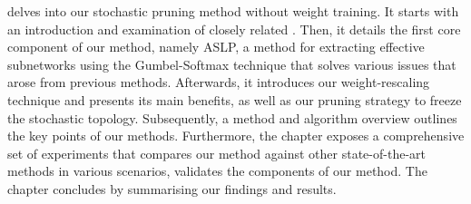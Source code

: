  delves into our stochastic pruning method without weight
training. It starts with an introduction and examination of closely related
\DIFdelbegin {}\DIFdelend \DIFaddbegin {}\DIFaddend . Then, it details the first core component of our method, namely
\acl{ASLP}, a method for extracting effective subnetworks using the
Gumbel-Softmax technique that solves various issues that arose from previous
methods. Afterwards, it introduces our weight-rescaling technique and presents
its main benefits, as well as our pruning strategy to freeze the stochastic
topology. Subsequently, a method and algorithm overview outlines the key points
of our methods. Furthermore, the chapter exposes a comprehensive set of
experiments that compares our method against other state-of-the-art methods in
various scenarios, validates the components of our method. The chapter concludes
by summarising our findings and results.\\